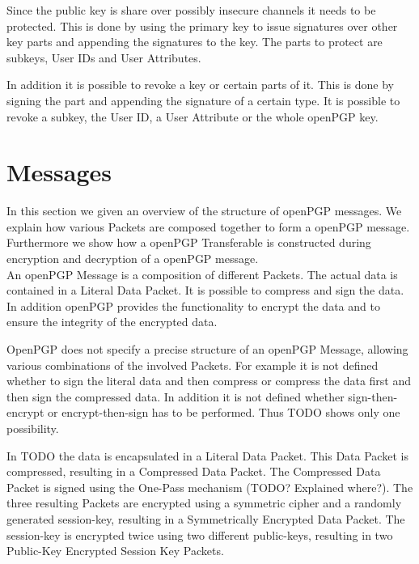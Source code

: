
Since the public key is share over possibly insecure channels it needs to be protected. This is done by using the primary key to issue signatures over other key parts and appending the signatures to the key. The parts to protect are subkeys, User IDs and User Attributes.


In addition it is possible to revoke a key or certain parts of it. This is done by signing the part and appending the signature of a certain type. It is possible to revoke a subkey, the User ID, a User Attribute or the whole openPGP key.

\section{Messages}

In this section we given an overview of the structure of openPGP messages. We explain how various Packets are composed together to form a openPGP message. Furthermore we show how a openPGP Transferable is constructed during encryption and decryption of a openPGP message. \\

An openPGP Message is a composition of different Packets. The actual data is contained in a Literal Data Packet. It is possible to compress and sign the data. In addition openPGP provides the functionality to encrypt the data and to ensure the integrity of the encrypted data.

OpenPGP does not specify a precise structure of an openPGP Message, allowing various combinations of the involved Packets. For example it is not defined whether to sign the literal data and then compress or compress the data first and then sign the compressed data. In addition it is not defined whether sign-then-encrypt or encrypt-then-sign has to be performed.  Thus TODO shows only one possibility.



In TODO the data is encapsulated in a Literal Data Packet. This Data Packet is compressed, resulting in a Compressed Data Packet. The Compressed Data Packet is signed using the One-Pass mechanism (TODO? Explained where?). The three resulting Packets are encrypted using a symmetric cipher and a randomly generated session-key, resulting in a Symmetrically Encrypted Data Packet. The session-key is encrypted twice using two different public-keys, resulting in two Public-Key Encrypted Session Key Packets.

